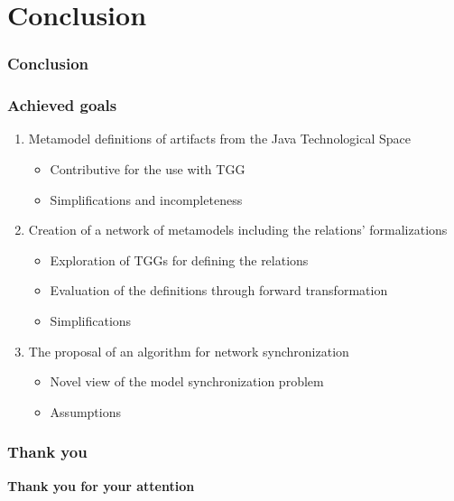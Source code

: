 \documentclass{beamer}
\begin{document}
\section{Conclusion} %
\begin{frame}
	\frametitle{Conclusion}
\end{frame}

\begin{frame}[t]
	\frametitle{Achieved goals}
	\begin{enumerate}
		\item Metamodel definitions of artifacts from the Java Technological Space
		\begin{itemize}
			\item Contributive for the use with TGG
			\item Simplifications and incompleteness
		\end{itemize}
		\pause
		\item Creation of a network of metamodels including the relations' formalizations
		\begin{itemize}
			\item Exploration of TGGs for defining the relations
			\item Evaluation of the definitions through forward transformation
			\item Simplifications
		\end{itemize}
		\pause
		\item The proposal of an algorithm for network synchronization
		\begin{itemize}
			\item Novel view of the model synchronization problem
			\item Assumptions
		\end{itemize}
	\end{enumerate}
\end{frame}

\begin{frame}
	\frametitle{Thank you}
	\begin{center}
		{\LARGE \textbf{Thank you for your attention}}
	\end{center}
\end{frame}
\end{document}
